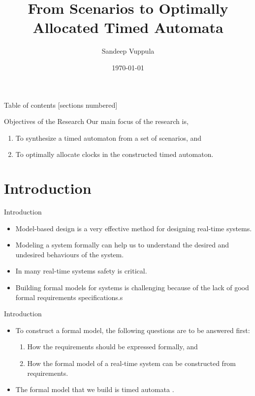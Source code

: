 \documentclass[10pt]{beamer}
\title{From Scenarios to Optimally Allocated Timed Automata}
\date{\today}
\author{Sandeep Vuppula}
\institute{University of Minnesota Duluth}
\theoremstyle{plain}
\theoremstyle{definition}
\begin{document}
\maketitle

\begin{frame}{Table of contents}
  [sections numbered]
  \tableofcontents[hideallsubsections]
\end{frame}

\begin{frame}{Objectives of the Research}
	Our main focus of the research is,
	\begin{enumerate}
		\item	To synthesize a timed automaton from a set of scenarios, and
		\item	To optimally allocate clocks in the constructed timed automaton.
	\end{enumerate}
\end{frame}

\section{Introduction}

\begin{frame}{Introduction}
	\begin{itemize}
		\item Model-based design is a very effective method for designing real-time systems.
		\item Modeling a system formally can help us to understand the desired and undesired behaviours of the system.
		\item In many real-time systems safety is critical.
		\item Building formal models for systems is challenging because of the lack of good formal requirements specifications.s
	\end{itemize}	
\end{frame}

\begin{frame}{Introduction}
	\begin{itemize}
		\item	{To construct a formal model, the following questions are to be answered first:
					\begin{enumerate}
						\item How the requirements should be expressed formally, and
						\item How the formal model of a real-time system can be constructed from requirements.
					\end{enumerate}
				}
		\item {The formal model that we build is \alert{timed automata} \cite{Alur:1994:TTA:180782.180519}.}
\end{itemize}
\end{frame}
\end{document}
